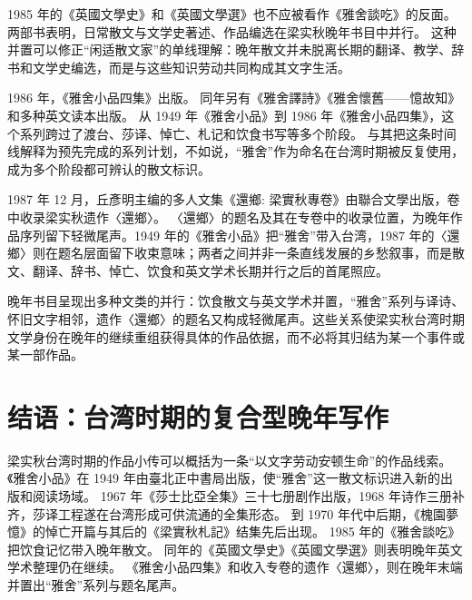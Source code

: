 \documentclass[UTF8,a4paper,zihao=-4,fontset=none]{ctexart}
\begin{document}
1985 年的《英國文學史》和《英國文學選》也不应被看作《雅舍談吃》的反面。两部书表明，日常散文与文学史著述、作品编选在梁实秋晚年书目中并行。\autocite{liang1985_yingguo_wenxueshi,liang1985_yingguo_wenxuan} 这种并置可以修正“闲适散文家”的单线理解：晚年散文并未脱离长期的翻译、教学、辞书和文学史编选，而是与这些知识劳动共同构成其文字生活。

1986 年，《雅舍小品四集》出版。\autocite{nmtl_liang_chronology,liang1986_yashe_xiaopin_siji} 同年另有《雅舍譯詩》《雅舍懷舊——憶故知》和多种英文读本出版。\autocite{nmtl_liang_chronology} 从 1949 年《雅舍小品》到 1986 年《雅舍小品四集》，这个系列跨过了渡台、莎译、悼亡、札记和饮食书写等多个阶段。\autocite{liang_yashe_xiaopin_ncl_scan,liang1972_yashe_xiaopin_xuji,liang1982_yashe_xiaopin_sanji,liang1986_yashe_xiaopin_siji} 与其把这条时间线解释为预先完成的系列计划，不如说，“雅舍”作为命名在台湾时期被反复使用，成为多个阶段都可辨认的散文标识。

1987 年 12 月，丘彥明主编的多人文集《還鄉: 梁實秋專卷》由聯合文學出版，卷中收录梁实秋遗作〈還鄉〉。\cite{1987還鄉} 〈還鄉〉的题名及其在专卷中的收录位置，为晚年作品序列留下轻微尾声。1949 年的《雅舍小品》把“雅舍”带入台湾，1987 年的〈還鄉〉则在题名层面留下收束意味；两者之间并非一条直线发展的乡愁叙事，而是散文、翻译、辞书、悼亡、饮食和英文学术长期并行之后的首尾照应。

晚年书目呈现出多种文类的并行：饮食散文与英文学术并置，“雅舍”系列与译诗、怀旧文字相邻，遗作〈還鄉〉的题名又构成轻微尾声。这些关系使梁实秋台湾时期文学身份在晚年的继续重组获得具体的作品依据，而不必将其归结为某一个事件或某一部作品。

\section{结语：台湾时期的复合型晚年写作}

梁实秋台湾时期的作品小传可以概括为一条“以文字劳动安顿生命”的作品线索。《雅舍小品》在 1949 年由臺北正中書局出版，使“雅舍”这一散文标识进入新的出版和阅读场域。\autocite{liang_yashe_xiaopin_ncl_scan,nmtl_liang_chronology} 1967 年《莎士比亞全集》三十七册剧作出版，1968 年诗作三册补齐，莎译工程遂在台湾形成可供流通的全集形态。\autocite{shakespeare1968_liang_quanji,nmtl_liang_chronology,liang1974_on_translating_shakespeare} 到 1970 年代中后期，《槐園夢憶》的悼亡开篇与其后的《梁實秋札記》结集先后出现。\autocite{liang_huaiyuan_mengyi_fareast_scan_pages,liang1978_zhaji} 1985 年的《雅舍談吃》把饮食记忆带入晚年散文。\autocite{liang1985_yashe_tanchi,chenzihua2012_yashe_tanchi,liang_yashe_tanchi_scan_unknown} 同年的《英國文學史》《英國文學選》则表明晚年英文学术整理仍在继续。\autocite{liang1985_yingguo_wenxueshi,liang1985_yingguo_wenxuan} 《雅舍小品四集》和收入专卷的遗作〈還鄉〉，则在晚年末端并置出“雅舍”系列与题名尾声。\cite{liang1986_yashe_xiaopin_siji,1987還鄉}
\end{document}
